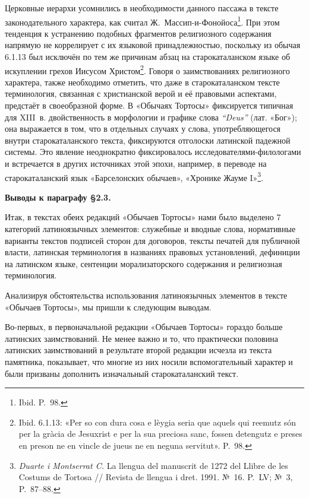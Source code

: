 Церковные иерархи усомнились в необходимости данного пассажа в тексте законодательного характера, как считал Ж.~Массип-и-Фонойоса\footnote{Ibid. P.~98.}. При этом тенденция к устранению подобных фрагментов религиозного содержания напрямую не коррелирует с их языковой принадлежностью, поскольку из обычая 6.1.13 был исключён по тем же причинам абзац на старокаталанском языке об искуплении грехов Иисусом Христом\footnote{Ibid. 6.1.13: «Per so con dura cosa e lèygia seria que aquels qui reemutz són per la gràcia de Jesuxrist e per la sua preciosa sanc, fossen detengutz e preses en preson ne en vincle de jueus ne en neguna servitut». P.~98.}. Говоря о заимствованиях религиозного характера, также необходимо отметить, что даже в старокаталанском тексте терминология, связанная с христианской верой и её правовыми аспектами, предстаёт в своеобразной форме. В «Обычаях Тортосы» фиксируется типичная для XIII~в. двойственность в морфологии и графике слова \emph{“Deus”} (лат. «Бог»); она выражается в том, что в отдельных случаях у слова, употребляющегося внутри старокаталанского текста, фиксируются отголоски латинской падежной системы. Это явление неоднократно фиксировалось исследователями-филологами и встречается в других источниках этой эпохи, например, в переводе на старокаталанский язык «Барселонских обычаев», «Хронике Жауме I»\footnote{\emph{Duarte i Montserrat C. }La llengua del manuscrit de 1272 del Llibre de les Costums de Tortosa // Revista de llengua i dret. 1991. №~16. P.~LV; №~3, P.~87--88.}.

\textbf{Выводы к параграфу §2.3}\textbf{.}

Итак, в текстах обеих редакций «Обычаев Тортосы» нами было выделено 7 категорий латиноязычных элементов: служебные и вводные слова, нормативные варианты текстов подписей сторон для договоров, тексты печатей для публичной власти, латинская терминология в названиях правовых установлений, дефиниции на латинском языке, сентенции морализаторского содержания и религиозная терминология.

Анализируя обстоятельства использования латиноязычных элементов в тексте «Обычаев Тортосы», мы пришли к следующим выводам.

Во-первых, в первоначальной редакции «Обычаев Тортосы» гораздо больше латинских заимствований. Не менее важно и то, что практически половина латинских заимствований в результате второй редакции исчезла из текста памятника, показывает, что многие из них носили вспомогательный характер и были призваны дополнить изначальный старокаталанский текст.

